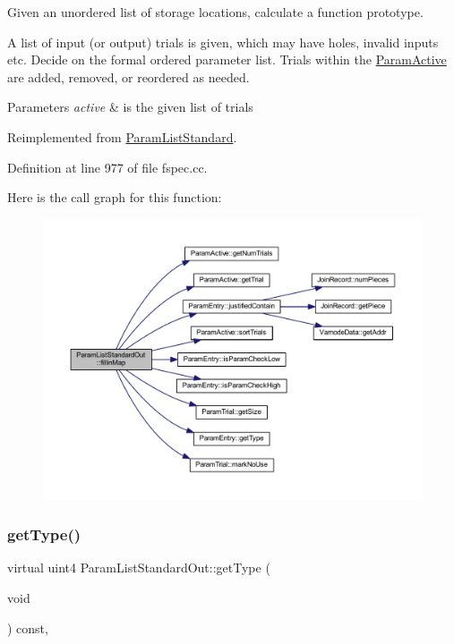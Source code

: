 Given an unordered list of storage locations, calculate a function prototype. 

A list of input (or output) trials is given, which may have holes, invalid inputs etc. Decide on the formal ordered parameter list. Trials within the \mbox{\hyperlink{class_param_active}{Param\+Active}} are added, removed, or reordered as needed. 
\begin{DoxyParams}{Parameters}
{\em active} & is the given list of trials \\
\hline
\end{DoxyParams}


Reimplemented from \mbox{\hyperlink{class_param_list_standard_a7fa7043f5c6bba995e2ea716ca16ccaf}{Param\+List\+Standard}}.



Definition at line 977 of file fspec.\+cc.

Here is the call graph for this function\+:
\nopagebreak
\begin{figure}[H]
\begin{center}
\leavevmode
\includegraphics[width=350pt]{class_param_list_standard_out_aab2d6055785c4e98b3a8c4e1b70f86be_cgraph}
\end{center}
\end{figure}
\mbox{\label{class_param_list_standard_out_a8d0f947ba2b94e2921712114d986f74f}} 
\subsubsection{\texorpdfstring{getType()}{getType()}}
{\footnotesize\ttfamily virtual uint4 Param\+List\+Standard\+Out\+::get\+Type (\begin{DoxyParamCaption}\item[{void}]{ }\end{DoxyParamCaption}) const\hspace{0.3cm}{\ttfamily [inline]}, {\ttfamily [virtual]}}



